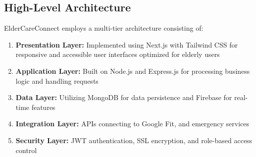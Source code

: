\subsection{High-Level Architecture}
ElderCareConnect employs a multi-tier architecture consisting of:
    \begin{enumerate}
        \item \textbf{Presentation Layer:} Implemented using Next.js with Tailwind CSS for responsive and accessible user interfaces optimized for elderly users
        \item \textbf{Application Layer:} Built on Node.js and Express.js for processing business logic and handling requests
        \item \textbf{Data Layer:} Utilizing MongoDB for data persistence and Firebase for real-time features
        \item \textbf{Integration Layer:} APIs connecting to Google Fit, and emergency services
        \item \textbf{Security Layer:} JWT authentication, SSL encryption, and role-based access control
    \end{enumerate}

